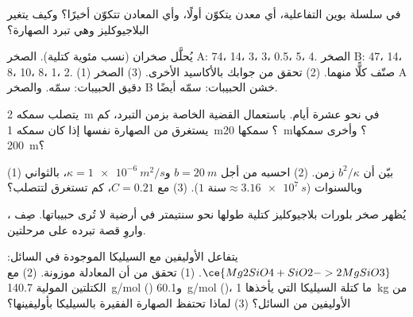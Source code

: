 \begin{exercise}[$\star$]\label{exo:g11:igneous-rocks:5}
في سلسلة بوين التفاعلية، أي معدن يتكوّن أولًا، وأي المعادن
تتكوّن أخيرًا؟ وكيف يتغير البلاجيوكليز وهي تبرد الصهارة؟
\end{exercise}

\begin{exercise}[$\star\star$]\label{exo:g11:igneous-rocks:6}
يُحلَّل صخران (نسب مئوية كتلية). الصخر A:  74، 
14،  3،  3،  0.5،  5،  4. الصخر B:
 47،  14،  8،  10،  8، 
1،  2. (1) صنّف كلًّا منهما. (2) تحقق من جوابك بالأكاسيد
الأخرى. (3) الصخر A دقيق الحبيبات: سمّه. والصخر B خشن الحبيبات: سمّه
أيضًا.
\end{exercise}

\begin{exercise}[$\star\star$]\label{exo:g11:igneous-rocks:7}
يتصلب  سمكه \qty{2}{m} في نحو عشرة أيام. باستعمال القضية
الخاصة بزمن التبرد، كم يستغرق  من الصهارة نفسها إذا كان
سمكه \qty{1}{m}؟  سمكها \qty{20}{m}؟ وأخرى سمكها \qty{200}{m}؟
\end{exercise}

\begin{exercise}[$\star\star$]\label{exo:g11:igneous-rocks:8}
(1) بيّن أن $b^2/\kappa$ زمن. (2) احسبه من أجل $b = \qty{20}{m}$
و$\kappa = \qty{1e-6}{m^2/s}$، بالثواني وبالسنوات
($\num{1}\text{ سنة} \approx \qty{3.16e7}{s}$). (3) مع $C = 0.21$، كم
تستغرق  لتتصلب؟
\end{exercise}

\begin{exercise}[$\star\star$]\label{exo:g11:igneous-rocks:9}
يُظهر صخر بلورات بلاجيوكليز كتلية طولها نحو سنتيمتر في
أرضية لا تُرى حبيباتها. صِف ، واروِ
قصة تبرده على مرحلتين.
\end{exercise}

\begin{exercise}[$\star\star$]\label{exo:g11:igneous-rocks:10}
يتفاعل الأوليفين مع السيليكا الموجودة في السائل: $\ce{Mg2SiO4 + SiO2 -> 2
MgSiO3}$. (1) تحقق من أن المعادلة موزونة. (2) مع الكتلتين المولية
\qty{140.7}{g/mol} () و\qty{60.1}{g/mol} ()، ما
كتلة السيليكا التي يأخذها \qty{1}{kg} من الأوليفين من السائل؟ (3) لماذا
تحتفظ الصهارة الفقيرة بالسيليكا بأوليفينها؟
\end{exercise}

